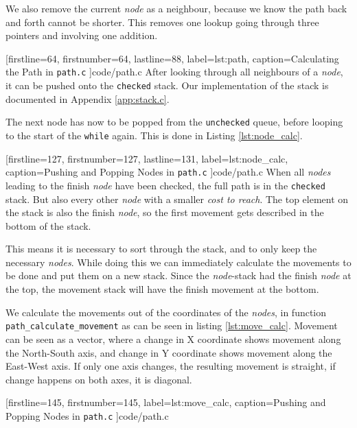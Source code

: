 We also remove the current \emph{node} as a neighbour,
because we know the path back and forth cannot be shorter.
This removes one lookup going through three pointers and involving one addition.


[firstline=64,			%
firstnumber=64,
lastline=88,			%
label=lst:path,	%
caption={Calculating the Path in {\tt path.c}}
]{code/path.c}
%
After looking through all neighbours of a \emph{node},
it can be pushed onto the {\tt checked} stack.
Our implementation of the stack is documented in Appendix \ref{app:stack.c}.

The next node has now to be popped from the {\tt unchecked} queue,
before looping to the start of the {\tt while} again.
This is done in Listing \ref{lst:node_calc}.


[firstline=127,			%
firstnumber=127,
lastline=131,			%
label=lst:node_calc,	%
caption={Pushing and Popping Nodes in {\tt path.c}}
]{code/path.c}
%
When all \emph{nodes} leading to the finish \emph{node} have been checked,
the full path is in the {\tt checked} stack.
But also every other \emph{node} with a smaller \emph{cost to reach}.
The top element on the stack is also the finish \emph{node},
so the first movement gets described in the bottom of the stack.

This means it is necessary to sort through the stack,
and to only keep the necessary \emph{nodes}.
While doing this we can immediately calculate the movements to be done
and put them on a new stack.
Since the \emph{node}-stack had the finish \emph{node} at the top,
the movement stack will have the finish movement at the bottom.

We calculate the movements out of the coordinates of the \emph{nodes},
in function {\tt path\_calculate\_movement} as can be seen in listing \ref{lst:move_calc}.
Movement can be seen as a vector,
where a change in X coordinate shows movement along the North-South axis,
and change in Y coordinate shows movement along the East-West axis.
If only one axis changes, the resulting movement is straight,
if change happens on both axes, it is diagonal.


[firstline=145,			%
firstnumber=145,
label=lst:move_calc,	%
caption={Pushing and Popping Nodes in {\tt path.c}}
]{code/path.c}
%